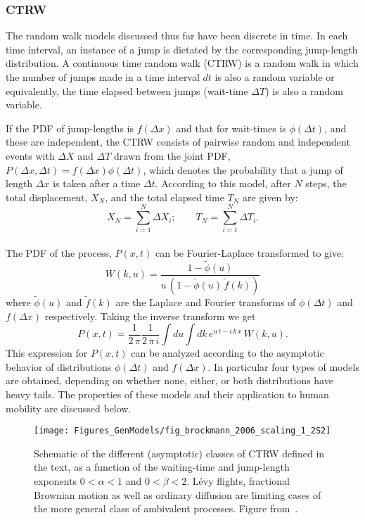 \subsubsection{CTRW}
\label{sec:ctrw}

The random walk models discussed thus far have been discrete in time. In each time interval, an instance of a jump is dictated by the corresponding jump-length distribution. A continuous time random walk (CTRW) is a random walk in which the number of jumps made in a time interval $d t$ is also a random variable or equivalently, the time elapsed between jumps (wait-time $\Delta T$) is also a random variable. 

If the PDF of jump-lengths is $f(\Delta x)$ and that for wait-times is $\phi(\Delta t)$, and these are independent, the CTRW consists of pairwise random and independent events with $\Delta X$ and $\Delta T$ drawn from the joint PDF, $P(\Delta x, \Delta t)  = f(\Delta x)\phi(\Delta t)$, which denotes the probability that a jump of length $\Delta x$ is taken after a time $\Delta t$. According to this model, after $N$ steps, the total displacement, $X_N$, and the total elapsed time $T_N$ are given by:
\begin{equation}
X_N = \sum_{i=1}^{N} \Delta X_i; \qquad
T_N = \sum_{i=1}^{N} \Delta T_i. 
\end{equation}\\
The PDF of the process, $P(x,t)$ can be Fourier-Laplace transformed to give:
\begin{equation}
W(k,u) = \frac{1-\tilde{\phi}(u)}{u\, (1-\tilde{\phi}(u)\, \tilde{f}(k))} \label{eq:ctrw:2}
\end{equation}
where $\tilde{\phi}(u)$ and $\tilde{f}(k)$ are the Laplace and Fourier transforms of $\phi(\Delta t)$ and $f(\Delta x)$ respectively. Taking the inverse transform we get
\begin{equation}
P(x,t) = \frac{1}{2\, \pi}\frac{1}{2\, \pi \, i} \int du \int dk \, e^{u\, t-i\, k\, x}\, W(k,u). \label{eq:ctrw:3}
\end{equation}
This expression for $P(x,t)$ can be analyzed according to the asymptotic behavior of distributions $\phi(\Delta t)$ and $f(\Delta x)$. In particular four types of models are obtained, depending on whether none, either, or both distributions have heavy tails. The properties of these models and their application to human mobility are discussed below.

\begin{figure}[t!]
\centering
\texttt{[image: Figures\_GenModels/fig\_brockmann\_2006\_scaling\_1\_2S2]}
\caption{ Schematic of the different (asymptotic) classes of CTRW defined in the text, as a
function of the waiting-time and jump-length exponents $ 0 < \alpha < 1$ and $0 < \beta < 2$. L\'evy flights, fractional Brownian motion
as well as ordinary diffusion are limiting cases of the more general class of ambivalent processes. Figure from~\cite{brockmann_2006_scaling}.}
\label{fig:brockmann_2006_scaling_1_2S2}
\end{figure}



